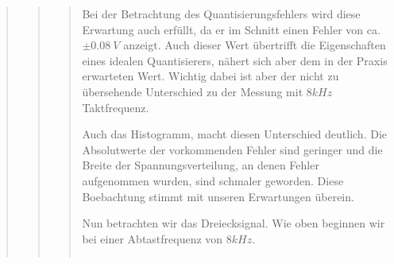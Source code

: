 \begin{quote}
\begin{quote}
\begin{quote}
            \vspace{1em}
            
            Bei der Betrachtung des Quantisierungsfehlers wird diese Erwartung
            auch erfüllt, da er im Schnitt einen Fehler von ca. $\pm 0.08\ V$
            anzeigt. Auch dieser Wert übertrifft die Eigenschaften eines idealen
            Quantisierers, nähert sich aber dem in der Praxis erwarteten
            Wert. Wichtig dabei ist aber der nicht zu übersehende Unterschied zu
            der Messung mit $8kHz$ Taktfrequenz.
            
            \vspace{1em}
            
            Auch das Histogramm, macht diesen Unterschied deutlich. Die
            Absolutwerte der vorkommenden Fehler sind geringer und die Breite 
            der Spannungsverteilung, an denen Fehler aufgenommen wurden, sind
            schmaler geworden. Diese Boebachtung stimmt mit unseren Erwartungen überein.
            
            \vspace{1em}
            
            Nun betrachten wir das Dreiecksignal. Wie oben beginnen wir bei einer 
            Abtastfrequenz von $8 kHz$.
            
            \begin{center}
                \begin{tabular}{ll}
                

\end{tabular}
\end{center}
\end{quote}
\end{quote}
\end{quote}
